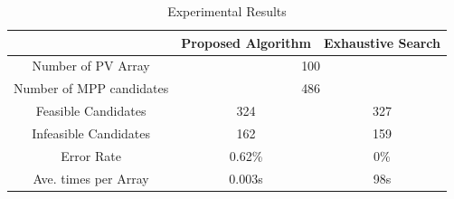 \documentclass[conference]{IEEEtran}
\begin{document}
\begin{table}[htbp]
\caption{Experimental Results}
\label{tab:result}
\begin{center}
\begin{tabular}{ccc}
\hline \hline
\multicolumn{1}{c|}{}                         & \multicolumn{1}{c|}{Proposed Algorithm} & \multicolumn{1}{c}{Exhaustive Search}\\ \hline
\multicolumn{1}{c|}{Number of PV Array}       & \multicolumn{2}{c}{100}                                                                                         \\ \hline
\multicolumn{1}{c|}{Number of MPP candidates} & \multicolumn{2}{c}{486}                                                                                       \\ \hline
\multicolumn{1}{c|}{Feasible Candidates}      & \multicolumn{1}{c|}{324}              & 327                                                                   \\ \hline
\multicolumn{1}{c|}{Infeasible Candidates}    & \multicolumn{1}{c|}{162}              & 159                                                                   \\ \hline
\multicolumn{1}{c|}{Error Rate}               & \multicolumn{1}{c|}{0.62\%}            & 0\%                                                                    \\ \hline
\multicolumn{1}{c|}{Ave. times per Array}     & \multicolumn{1}{c|}{0.003s}            & 98s            \\ \hline                                                     
\end{tabular}
\end{center}
\end{table}

\end{document}
